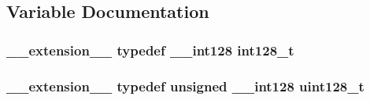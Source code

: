 \subsection{Variable Documentation}
\hypertarget{utils-test_8hpp_ab6c6bc8799eef1e3d4adc2bd1972e88b}{
\subsubsection[{int128\-\_\-t}]{\setlength{\rightskip}{0pt plus 5cm}\-\_\-\-\_\-extension\-\_\-\-\_\- typedef \-\_\-\-\_\-int128 int128\-\_\-t}}\label{utils-test_8hpp_ab6c6bc8799eef1e3d4adc2bd1972e88b}
\hypertarget{utils-test_8hpp_ab76ef99db23830c7fec1e3019737cab4}{
\subsubsection[{uint128\-\_\-t}]{\setlength{\rightskip}{0pt plus 5cm}\-\_\-\-\_\-extension\-\_\-\-\_\- typedef unsigned \-\_\-\-\_\-int128 uint128\-\_\-t}}\label{utils-test_8hpp_ab76ef99db23830c7fec1e3019737cab4}
